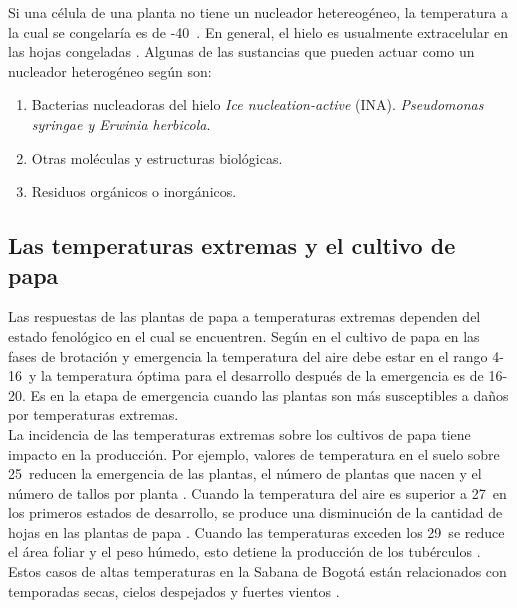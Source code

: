 
Si una célula de una planta no tiene un nucleador hetereogéneo, la temperatura a la cual se congelaría es de -40\celc \ . En general, el hielo es usualmente extracelular en las hojas congeladas \citep{pearce2001plant}. Algunas de las sustancias que pueden actuar como un nucleador heterogéneo según \citet{pearce2001plant} son:
\begin{enumerate}
\item Bacterias nucleadoras del hielo \textit{Ice nucleation-active} (INA). \textit{Pseudomonas syringae y Erwinia herbicola}.
\item Otras moléculas y estructuras biológicas.
\item Residuos orgánicos o inorgánicos.
\end{enumerate}


\subsection{Las temperaturas extremas y el cultivo de papa}

Las respuestas de las plantas de papa a temperaturas extremas dependen del estado fenológico en el cual se encuentren. Según \citet{Hatfield2008} en el cultivo de papa en las fases de brotación y emergencia la temperatura del aire debe estar en el rango 4-16\celc\ y la temperatura óptima para el desarrollo después de la emergencia es de 16-20\celsius. Es en la etapa de emergencia cuando las plantas son más susceptibles a daños por temperaturas extremas.\\

La incidencia de las temperaturas extremas sobre los cultivos de papa tiene impacto en la producción. Por ejemplo, valores de temperatura en el suelo sobre 25\celc \  reducen la emergencia de las plantas, el número de plantas que nacen y el número de tallos por planta \citep{birch2012crops, sale1979growth}. Cuando la temperatura del aire es superior a 27\celc \  en los primeros estados de desarrollo, se produce una disminución de la cantidad de hojas en las plantas de papa \citep{birch2012crops, sale1979growth}. Cuando las temperaturas exceden los 29\celc \  se reduce el área foliar y el peso húmedo, esto detiene la producción de los tubérculos \citep{prange1990reduction}. Estos casos de altas temperaturas en la Sabana de Bogotá están relacionados con temporadas secas, cielos despejados y fuertes vientos \citep{IDEAM2017c}.\\

